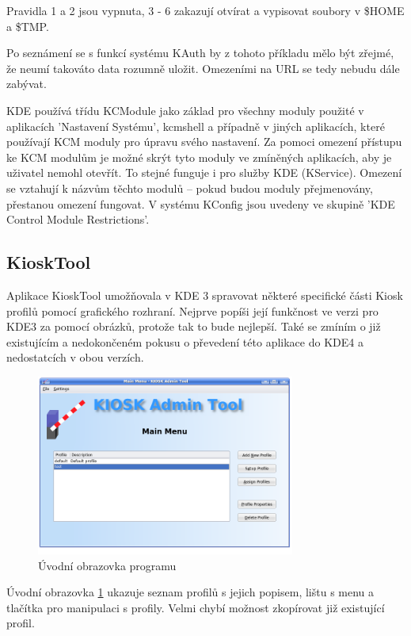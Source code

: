 Pravidla 1 a 2 jsou vypnuta, 3 - 6 zakazují otvírat a vypisovat soubory
v \$HOME a \$TMP.

Po seznámení se s funkcí systému KAuth by z tohoto příkladu mělo být zřejmé, že
neumí takováto data rozumně uložit. Omezeními na URL se tedy nebudu dále
zabývat.

KDE používá třídu KCModule jako základ pro všechny moduly použité v aplikacích
'Nastavení Systému', kcmshell a případně v jiných aplikacích, které používají
KCM moduly pro úpravu svého nastavení. Za pomoci omezení přístupu ke KCM modulům
je možné skrýt tyto moduly ve zmíněných aplikacích, aby je uživatel nemohl 
otevřít. To stejné funguje i pro služby KDE (KService). Omezení se vztahují
k názvům těchto modulů -- pokud budou moduly přejmenovány, přestanou omezení
fungovat. V systému KConfig jsou uvedeny ve skupině 'KDE Control Module Restrictions'.

\subsection{KioskTool}
Aplikace KioskTool umožňovala v KDE 3 spravovat některé specifické části Kiosk
profilů pomocí grafického rozhraní. Nejprve popíši její funkčnost ve verzi pro
KDE3 za pomocí obrázků, protože tak to bude nejlepší. Také se zmíním
o již existujícím a nedokončeném pokusu o převedení této aplikace do KDE4
a nedostatcích v obou verzích. 

\begin{figure}[h]
    \centering
    \includegraphics[width=8.5cm]{obrazky/KioskToolKDE3/uvodni_obrazovka.png}
    \caption{Úvodní obrazovka programu}
    \label{fig:kt3_uvodni}
\end{figure}
Úvodní obrazovka \ref{fig:kt3_uvodni} ukazuje seznam profilů s jejich popisem,
lištu s menu a tlačítka pro manipulaci s profily. Velmi chybí možnost zkopírovat
již existující profil.

